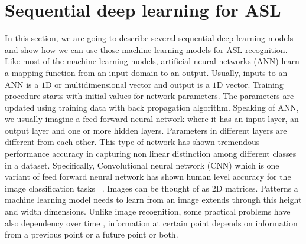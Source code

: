 \documentclass[10pt,twocolumn,letterpaper]{article}
\begin{document}
\section{Sequential deep learning for ASL}
In this section, we are going to describe several sequential deep learning models and show how we can use those machine learning models for ASL recognition. Like most of the machine learning models, artificial neural networks (ANN) learn a mapping function from an input domain to an output. Usually, inputs to an ANN is a $1$D or multidimensional vector and output is a $1$D vector. Training procedure starts with initial values for network parameters. The parameters are updated using training data with back propagation algorithm. 
Speaking of ANN, we usually imagine a feed forward neural network where it has an input layer, an output layer and one or more hidden layers. Parameters in different layers are different from each other. This type of network has shown tremendous performance accuracy in capturing non linear distinction among different classes in a dataset. Specifically, Convolutional neural network (CNN) which is one variant of feed forward neural network has shown human level accuracy for the image classification tasks ~\cite{NIPS2012_4824}. Images can be thought of as $2$D matrices. Patterns a machine learning model needs to learn from an image extends through this height and width dimensions. Unlike image recognition, some practical problems have also dependency over time \ie, information at certain point depends on information from a previous point or a future point or both. %
\end{document}
